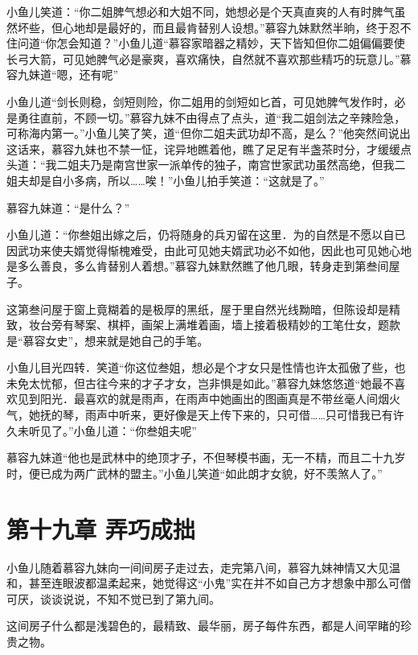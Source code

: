 \documentclass[12pt,oneside]{book}
\begin{document}
小鱼儿笑道：``你二姐脾气想必和大姐不同，她想必是个天真直爽的人有时脾气虽然坏些，但心地却是最好的，而且最肯替别人设想。''慕容九妹默然半晌，终于忍不住问道``你怎会知道？''小鱼儿道``慕容家暗器之精妙，天下皆知但你二姐偏偏要使长弓大箭，可见她脾气必是豪爽，喜欢痛快，自然就不喜欢那些精巧的玩意儿。''慕容九妹道``嗯，还有呢''

小鱼儿道``剑长则稳，剑短则险，你二姐用的剑短如匕首，可见她脾气发作时，必是勇往直前，不顾一切。''慕容九妹不由得点了点头，道``我二姐剑法之辛辣险急，可称海内第一。''小鱼儿笑了笑，道``但你二姐夫武功却不高，是么？''他突然间说出这话来，慕容九妹也不禁一怔，诧异地瞧着他，瞧了足足有半盏茶时分，才缓缓点头道：``我二姐夫乃是南宫世家一派单传的独子，南宫世家武功虽然高绝，但我二姐夫却是自小多病，所以\ldots\ldots 唉！''小鱼儿拍手笑道：``这就是了。''

慕容九妹道：``是什么？''

小鱼儿道：``你叁姐出嫁之后，仍将随身的兵刃留在这里．为的自然是不愿以自已因武功来使夫婿觉得惭槐难受，由此可见她夫婿武功必不如他，因此也可见她心地是多么善良，多么肯替别人着想。''慕容九妹默然瞧了他几眼，转身走到第叁间屋子。

这第叁问屋于窗上竟糊着的是极厚的黑纸，屋于里自然光线黝暗，但陈设却是精致，妆台旁有琴案、棋枰，画架上满堆着画，墙上接着极精妙的工笔仕女，题款是``慕容女史''，想来就是她自己的手笔。

小鱼儿目光四转．笑道``你这位叁姐，想必是个才女只是性情也许太孤傲了些，也未免太忧郁，但古往今来的才子才女，岂非惧是如此。''慕容九妹悠悠道``她最不喜欢见到阳光．最喜欢的就是雨声，在雨声中她画出的图画真是不带丝毫人间烟火气，她抚的琴，雨声中听来，更好像是天上传下来的，只可借\ldots\ldots 只可惜我已有许久未听见了。''小鱼儿道：``你叁姐夫呢''

慕容九妹道``他也是武林中的绝顶才子，不但琴模书画，无一不精，而且二十九岁时，便已成为两广武林的盟主。''小鱼儿笑道``如此朗才女貌，好不羡煞人了。''

\hypertarget{ux7b2cux5341ux4e5dux7ae0-ux5f04ux5de7ux6210ux62d9}{%
\chapter{第十九章
弄巧成拙}\label{ux7b2cux5341ux4e5dux7ae0-ux5f04ux5de7ux6210ux62d9}}

小鱼儿随着慕容九妹向一间间房子走过去，走完第八间，慕容九妹神情又大见温和，甚至连眼波都温柔起来，她觉得这``小鬼''实在并不如自己方才想象中那么可僧可厌，谈谈说说，不知不觉已到了第九间。

这间房子什么都是浅碧色的，最精致、最华丽，房子每件东西，都是人间罕睹的珍贵之物。
\end{document}
